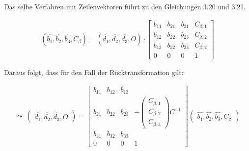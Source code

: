 	
Das selbe Verfahren mit Zeilenvektoren führt zu den Gleichungen 3.20 und 3.21.
	
%	
	

	\begin{gather}
	(\hat{b_1}, \hat{b_2}, \hat{b_3}, C_\beta) = (\hat{d_1},\hat{d_2}, \hat{d_3}, O) \cdot
	\begin{bmatrix} 
	b_{11} & b_{21} & b_{31} & C_{\beta,1}\\
	b_{12} & b_{22} & b_{23} & C_{\beta,2}\\
	b_{13} & b_{32} & b_{33} & C_{\beta,2}\\
	0           &       0       &   0         & 1   
	\end{bmatrix}
	\end{gather}	
	
	Daraus folgt, dass für den Fall der Rücktransformation gilt:
	
	\begin{gather}
	\leadsto \: \begin{pmatrix}
	\hat{d_1},\hat{d_2},\hat{d_3},O
	\end{pmatrix} = 
	\begin{bmatrix}
	b_{11} & b_{12} & b_{13} & \\
	b_{21} & b_{22} & b_{23} &  -\begin{pmatrix}
C_{\beta,1}\\
C_{\beta,2}\\
C_{\beta,3}
	\end{pmatrix}C^{-1}\\
	b_{31} & b_{32} & b_{33} & \\
	0&0&0 & 1
	\end{bmatrix}
	\begin{pmatrix}
	\hat{b_1},\hat{b_2},\hat{b_3},C_\beta
	\end{pmatrix}
	\end{gather}	



